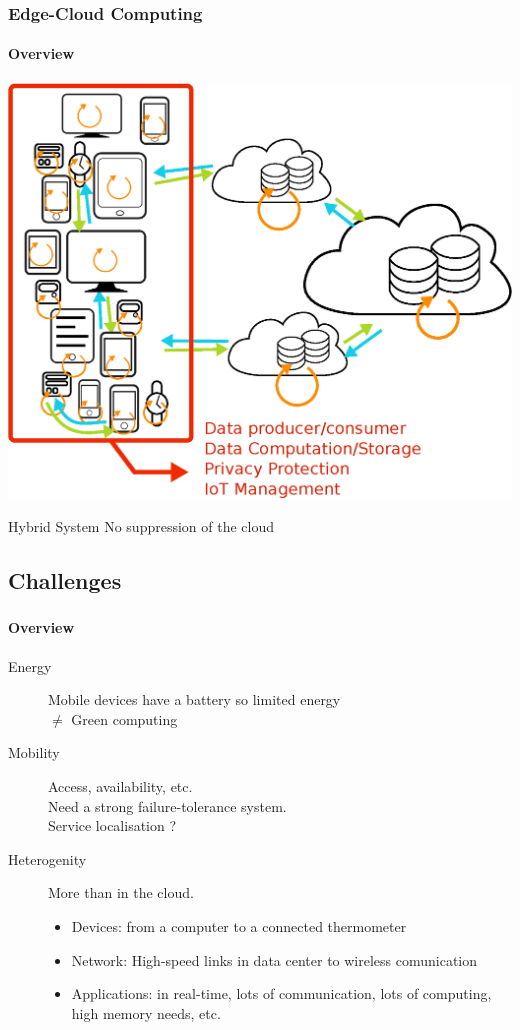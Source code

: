 \documentclass[utf8,xcolor=table, page number]{earlywinter}
\begin{document}
\begin{frame}
\frametitle{Edge-Cloud Computing}
\framesubtitle{Overview}

  \begin{center}
    \includegraphics[width=0.6\linewidth]{edgePrinciple.eps}
  \end{center}
  
  \begin{alertblock}{Hybrid System}
    No suppression of the cloud
  \end{alertblock}

\end{frame}

\subsection{Challenges}


\begin{frame}
  \frametitle{\subsecname}
  \framesubtitle{Overview}
  \begin{description}
    \item[{\color{orange!95!black}Energy}] Mobile devices have a battery so limited energy\\
      $\neq$ Green computing
    \item[{\color{orange!95!black}Mobility}] Access, availability, etc.\\
      Need a strong failure-tolerance system.\\
      Service localisation ?
    \item[{\color{orange!95!black}Heterogenity}] More than in the cloud.\\
      \begin{itemize}
        \item Devices: from a computer to a connected thermometer\\
        \item Network: High-speed links in data center to wireless comunication
        \item Applications: in real-time, lots of communication, lots of computing,
      high memory needs, etc.
      \end{itemize}
  \end{description}
\end{frame}
\end{document}
